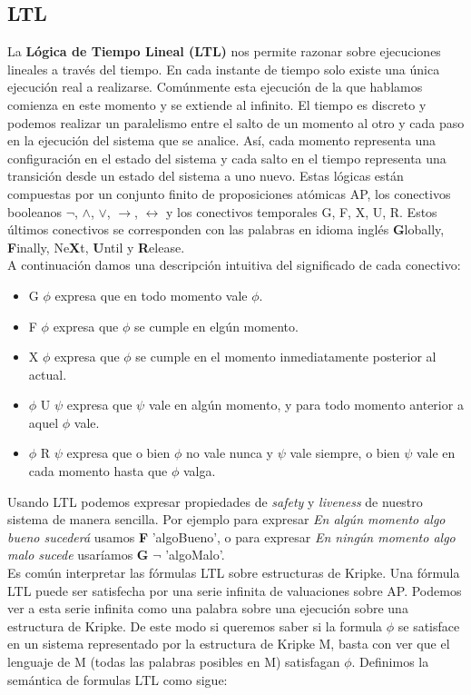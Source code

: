 \documentclass[titlepage, 12pt]{book}
\begin{document}
\subsection{LTL}
La \textbf{L\'ogica de Tiempo Lineal (LTL)} nos permite razonar sobre ejecuciones lineales a trav\'es del tiempo. En cada instante de tiempo solo existe una \'unica ejecuci\'on real a realizarse. Com\'unmente esta ejecuci\'on de la que hablamos comienza en este momento y se extiende al infinito. El tiempo es discreto y podemos realizar un paralelismo entre el salto de un momento al otro y cada paso en la ejecuci\'on del sistema que se analice. As\'i, cada momento representa una configuraci\'on en el estado del sistema y cada salto en el tiempo representa una transici\'on desde un estado del sistema a uno nuevo. Estas l\'ogicas est\'an compuestas por un conjunto finito de proposiciones at\'omicas AP, los conectivos booleanos $\neg$, $\wedge$, $\vee$, $\rightarrow$, $\leftrightarrow$ y los conectivos temporales G, F, X, U, R. Estos \'ultimos conectivos se corresponden con las palabras en idioma ingl\'es \textbf{G}lobally, \textbf{F}inally, Ne\textbf{X}t, \textbf{U}ntil y \textbf{R}elease.\\ A continuaci\'on damos una descripci\'on intuitiva del significado de cada conectivo:
\begin{itemize}
\item G $\phi$ expresa que en todo momento vale $\phi$.
\item F $\phi$ expresa que $\phi$ se cumple en elg\'un momento.
\item X $\phi$ expresa que $\phi$ se cumple en el momento inmediatamente posterior al actual.
\item $\phi$ U $\psi$ expresa que $\psi$ vale en alg\'un momento, y para todo momento anterior a aquel $\phi$ vale.
\item $\phi$ R $\psi$ expresa que o bien $\phi$ no vale nunca y $\psi$ vale siempre, o bien $\psi$ vale en cada momento hasta que $\phi$ valga.
\end{itemize}
Usando LTL podemos expresar propiedades de \textit{safety} y \textit{liveness} de nuestro sistema de manera sencilla. Por ejemplo para expresar \textit{En alg\'un momento algo bueno suceder\'a} usamos  \textbf{F} 'algoBueno', o para expresar \textit{En ning\'un momento algo malo sucede} usar\'iamos \textbf{G} $\neg$ 'algoMalo'.\\

Es com\'un interpretar las f\'ormulas LTL sobre estructuras de Kripke. Una f\'ormula LTL puede ser satisfecha por una serie infinita de valuaciones sobre AP. Podemos ver a esta serie infinita como una palabra sobre una ejecuci\'on sobre una estructura de Kripke. De este modo si queremos saber si la formula $\phi$ se satisface en un sistema representado por la estructura de Kripke M, basta con ver que el lenguaje de M (todas las palabras posibles en M) satisfagan $\phi$. Definimos la sem\'antica de formulas LTL como sigue:\\
\end{document}
